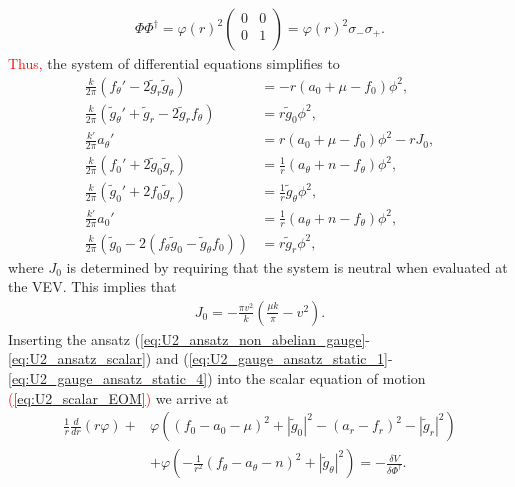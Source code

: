     \begin{align}
        \Phi \Phi^{\dag} = \varphi(r)^2 \begin{pmatrix} 
            0 & 0\\
            0 & 1\\
        \end{pmatrix} = \varphi(r)^2 \sigma_- \sigma_+.
    \end{align}
    \textcolor{red}{Thus,} the system of differential equations \colorbox{red}{} simplifies to
    \begin{align}
        \frac{k}{2 \pi } \left(f_{\theta}' - 2\tilde{g}_r \tilde{g}_{\theta}\right) &= -r \left(a_0 + \mu - f_0\right) \phi^2,\\
        \frac{k}{2 \pi} \left(\tilde{g}_{\theta}' + \tilde{g}_r - 2 \tilde{g}_r f_{\theta} \right) & = r\tilde{g}_0 \phi^2, \\
        \frac{k'}{2 \pi} a_{\theta}' &= r \left(a_0 +\mu - f_0 \right)\phi^2 - rJ_0, \\
        \frac{k}{2\pi} \left(f_0'+2 \tilde{g}_0\tilde{g}_r\right) &= \frac{1}{r} \left(a_{\theta}+n - f_{\theta}\right)\phi^2, \\
        \frac{k}{2\pi}\left(\tilde{g}_0' + 2 f_0 \tilde{g}_r \right) &=\frac{1}{r} \tilde{g}_{\theta}\phi^2, \\
        \frac{k'}{2\pi} a_0'&= \frac{1}{r} \left(a_{\theta}+n - f_{\theta}\right) \phi^2, \\
        \frac{k}{2\pi} \left(\tilde{g}_0 - 2\left(f_{\theta} \tilde{g}_0 - \tilde{g}_{\theta} f_0\right)\right) &= r \tilde{g}_r \phi^2,
    \end{align}
    where $J_0$ is determined by requiring that the system is neutral when evaluated at the VEV. This implies that
    \begin{align}
        J_0 = -\frac{\pi v^2}{k} \left(\frac{\mu k}{\pi}- v^2 \right).
    \end{align}
Inserting the ansatz (\ref{eq:U2_ansatz_non_abelian_gauge}-\ref{eq:U2_ansatz_scalar}) and (\ref{eq:U2_gauge_ansatz_static_1}-\ref{eq:U2_gauge_ansatz_static_4}) into the scalar equation of motion \textcolor{red}{(}\ref{eq:U2_scalar_EOM}\textcolor{red}{)} we arrive at
\begin{align}
    \frac{1}{r} \frac{d}{dr} \left(r \varphi\right)+ &\varphi \left( \left(f_0 -a_0 -\mu\right)^2 + |\tilde{g}_0|^2 - \left(a_r -f_r\right)^2 - |\tilde{g}_r|^2 \right)\nonumber \\
    &+ \varphi \left(-\frac{1}{r^2} \left(f_{\theta} - a_{\theta} -n\right)^2 +|\tilde{g}_{\theta}|^2 \right) = - \frac{\delta V}{\delta \Phi^{\dag}}.
\end{align}
